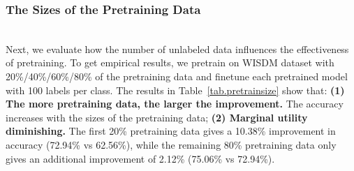 \vspace{-1mm}
\subsubsection{The Sizes of the Pretraining Data\nopunct}\ \\
Next, we evaluate how the number of unlabeled data influences the effectiveness of pretraining. 
To get empirical results, we pretrain \system on WISDM dataset with 20\%/40\%/60\%/80\% of the pretraining data and finetune each pretrained model with 100 labels per class. 
The results in Table~\ref{tab.pretrainsize} show that: 
\textbf{(1) The more pretraining data, the larger the improvement.} The accuracy increases with the sizes of the pretraining data; \textbf{(2) Marginal utility diminishing.} The first 20\% pretraining data gives a 10.38\% improvement in accuracy (72.94\% vs 62.56\%), while the remaining 80\% pretraining data only gives an additional improvement of 2.12\% (75.06\% vs 72.94\%). 


